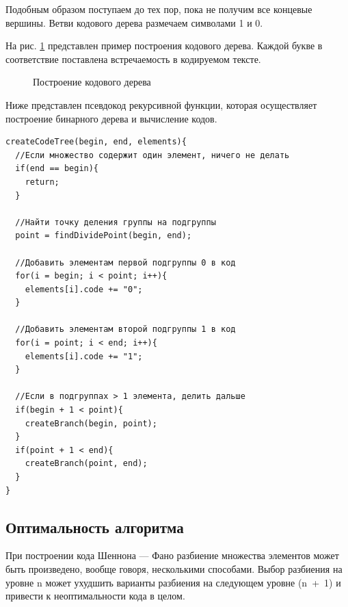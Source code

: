 \documentclass{article}
\begin{document}
Подобным образом поступаем до тех пор, пока не получим все концевые 
вершины. Ветви кодового дерева размечаем символами 1 и 0. 

На рис. \ref{tree} представлен пример 
построения кодового дерева. Каждой букве в соответствие поставлена встречаемость в кодируемом тексте.

\begin{figure}[H]
  \caption{Построение кодового дерева\label{tree}}
\end{figure}

\newpage
Ниже представлен псевдокод рекурсивной функции, которая осуществляет построение бинарного дерева и вычисление кодов.
\begin{lstlisting}
createCodeTree(begin, end, elements){
  //Если множество содержит один элемент, ничего не делать
  if(end == begin){
    return;
  }
  
  //Найти точку деления группы на подгруппы
  point = findDividePoint(begin, end);
  
  //Добавить элементам первой подгруппы 0 в код
  for(i = begin; i < point; i++){
    elements[i].code += "0";
  }
  
  //Добавить элементам второй подгруппы 1 в код
  for(i = point; i < end; i++){
    elements[i].code += "1";
  }
  
  //Если в подгруппах > 1 элемента, делить дальше
  if(begin + 1 < point){
    createBranch(begin, point);
  }
  if(point + 1 < end){
    createBranch(point, end);
  }
}
\end{lstlisting}

\subsection{Оптимальность алгоритма}
При построении кода Шеннона --- Фано разбиение множества элементов может быть произведено, вообще 
говоря, несколькими способами. Выбор разбиения на уровне n может ухудшить варианты разбиения на 
следующем уровне (n~+~1) и привести к неоптимальности кода в целом. 
\end{document}
